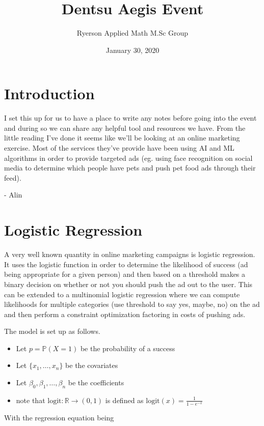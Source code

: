 \documentclass[12pt,a4paper]{article}
\title{Dentsu Aegis Event}
\author{Ryerson Applied Math M.Sc Group}
\date{January 30, 2020}
\newcommand{\Px}{\mathbb{P}}
\newcommand{\logit}{\text{logit}}
\newcommand{\R}{\mathbb{R}}
\begin{document}
\maketitle

\section{Introduction}
I set this up for us to have a place to write any notes before going into the event and during so we can share any helpful tool and resources we have. From the little reading I've done it seems like we'll be looking at an online marketing exercise. Most of the services they've provide have been using AI and ML algorithms in order to provide targeted ads (eg. using face recognition on social media to determine which people have pets and push pet food ads through their feed). \\
\begin{flushright}
- Alin
\end{flushright}

\section{Logistic Regression}

A very well known quantity in online marketing campaigns is logistic regression. It uses the logistic function in order to determine the likelihood of success (ad being appropriate for a given person) and then based on a threshold makes a binary decision on whether or not you should push the ad out to the user. This can be extended to a multinomial logistic regression where we can compute likelihoods for multiple categories (use threshold to say yes, maybe, no) on the ad and then perform a constraint optimization factoring in costs of pushing ads. 

The model is set up as follows. 
\begin{itemize}
    \item Let $p = \Px (X=1)$ be the probability of a success 
    \item Let $\{ x_1, \ldots, x_n \}$ be the covariates 
    \item Let $\beta_0, \beta_1, \ldots, \beta_n$ be the coefficients
    \item note that $\logit: \R \rightarrow (0,1)$ is defined as $\logit(x) = \frac{1}{1-e^{-x}}$
\end{itemize}

With the regression equation being
\end{document}
